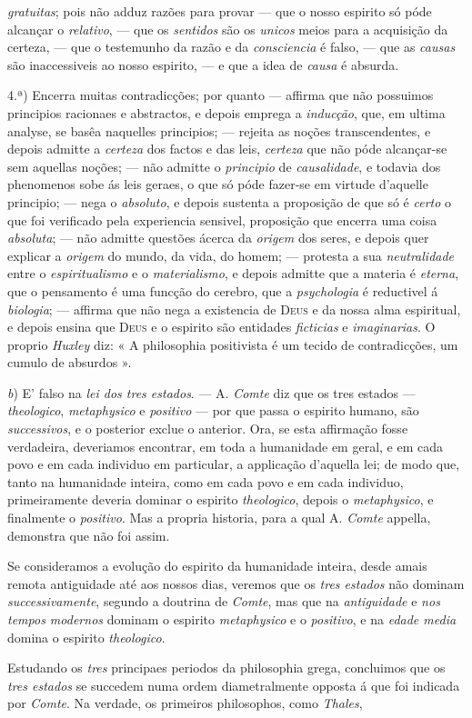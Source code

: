 \emph{gratuitas}; pois não adduz razões para provar --- que o nosso espirito só póde alcançar o \emph{relativo}, --- que os \emph{sentidos} são os \emph{unicos} meios para a acquisição da certeza, --- que o testemunho da razão e da \emph{consciencia} é falso, --- que as \emph{causas} são inaccessiveis ao nosso espirito, --- e que a idea de \emph{causa} é absurda.\par 4.ª) Encerra muitas contradicções; por quanto --- affirma que não possuimos principios racionaes e abstractos, e depois emprega a \emph{inducção}, que, em ultima analyse, se basêa naquelles principios; --- rejeita as noções transcendentes, e depois admitte a \emph{certeza} dos factos e das leis, \emph{certeza} que não póde alcançar-se sem aquellas noções; --- não admitte o \emph{principio} de \emph{causalidade}, e todavia dos phenomenos sobe ás leis geraes, o que só póde fazer-se em virtude d'aquelle principio; --- nega o \emph{absoluto}, e depois sustenta a proposição de que só é \emph{certo} o que foi verificado pela experiencia sensivel, proposição que encerra uma coisa \emph{absoluta}; --- não admitte questões ácerca da \emph{origem} dos seres, e depois quer explicar a \emph{origem} do mundo, da vida, do homem; --- protesta a sua \emph{neutralidade} entre o \emph{espiritualismo} e o \emph{materialismo}, e depois admitte que a materia é \emph{eterna}, que o pensamento é uma funcção do cerebro, que a \emph{psychologia} é reductivel á \emph{biologia}; --- affirma que não nega a existencia de \textsc{Deus} e da nossa alma espiritual, e depois ensina que \textsc{Deus} e o espirito são entidades \emph{ficticias} e \emph{imaginarias}. O proprio \emph{Huxley} diz: « A philosophia positivista é um tecido de contradicções, um cumulo de absurdos ».\par \emph{b}) E' falso na \emph{lei dos tres estados}. --- A. \emph{Comte} diz que os tres estados --- \emph{theologico}, \emph{metaphysico} e \emph{positivo} --- por que passa o espirito humano, são \emph{successivos}, e o posterior exclue o anterior. Ora, se esta affirmação fosse verdadeira, deveriamos encontrar, em toda a humanidade em geral, e em cada povo e em cada individuo em particular, a applicação d'aquella lei; de modo que, tanto na humanidade inteira, como em cada povo e em cada individuo, primeiramente deveria dominar o espirito \emph{theologico}, depois o \emph{metaphysico}, e finalmente o \emph{positivo}. Mas a propria historia, para a qual A. \emph{Comte} appella, demonstra que não foi assim.\par Se consideramos a evolução do espirito da humanidade inteira, desde amais remota antiguidade até aos nossos dias, veremos que os \emph{tres estados} não dominam \emph{successivamente}, segundo a doutrina de \emph{Comte}, mas que na \emph{antiguidade} e \emph{nos tempos modernos} dominam o espirito \emph{metaphysico} e o \emph{positivo}, e na \emph{edade media} domina o espirito \emph{theologico}.\par Estudando os \emph{tres} principaes periodos da philosophia grega, concluimos que os \emph{tres estados} se succedem numa ordem diametralmente opposta á que foi indicada por \emph{Comte}. Na verdade, os primeiros philosophos, como \emph{Thales}, 